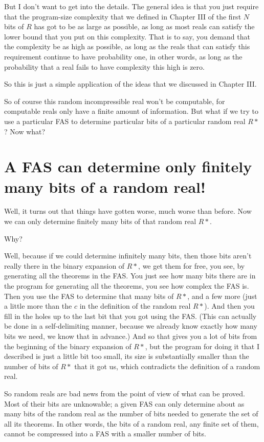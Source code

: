 \documentclass[12pt]{book}
\begin{document}
But I don't want to get into the details. The general idea is that you just require that
the program-size  complexity that we defined in Chapter III of the first $N$ bits of $R$ has
got to be as large as possible, as long as most reals can satisfy the lower bound that
you put on this complexity. That is to say, you demand that the complexity be as high
as possible, as long as the reals that can satisfy this requirement continue to have
probability one, in other words, as long as the probability that a real fails to have
complexity this high is zero.
 
So this is just a simple application of the ideas that we discussed in Chapter III.
 
So of course this random incompressible real won't be computable, for computable reals
only have a finite amount of information.
But what if we try to use a particular FAS to determine particular bits of a particular
random real $R*$?
Now what?

\section*{A FAS can determine only finitely many bits of a random real!}

Well, it turns out that things have gotten worse, much worse than before. Now we can
only determine finitely many bits of that random real $R*$.
 
Why?
 
Well, because if we could determine infinitely many bits, then those bits aren't really
there in the binary expansion of $R*$, we get them for free, you see, by generating all
the theorems in the FAS.   You just see how many bits there are in the program for
generating all the theorems, you see how complex the FAS is.  Then you use the FAS to
determine that many bits of $R*$, and a few more (just a little more than the $c$ in the
definition of the random real $R*$).   And then you fill in the holes up to the last bit
that you got using the FAS. 
(This can
actually be done in a self-delimiting manner, 
because we already know exactly how many bits we need, we know that in advance.)
And so that
gives you a lot of bits from the beginning of the binary expansion of $R*$,  but the program
for doing it that I described is just a little bit too small, its size is substantially
smaller than the number of bits of $R*$ that it got us, which contradicts the definition
of a random real.
 
So random reals are bad news from the point of view of what can be proved.
Most of their bits are unknowable; a given FAS can only determine about as many bits of the
random real as the number of bits needed to generate the set of all its theorems.
In other words, the bits of a random real, any finite set of them,
cannot be compressed into a FAS with a smaller number of bits.
 
\end{document}
